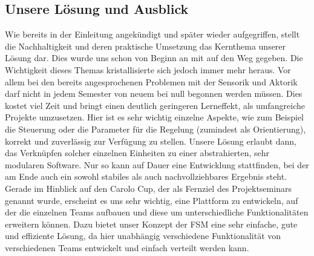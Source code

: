 \subsection{Unsere Lösung und Ausblick}
Wie bereits in der Einleitung angekündigt und später wieder aufgegriffen, stellt die Nachhaltigkeit und deren praktische Umsetzung das Kernthema unserer Lösung dar. Dies wurde uns schon von Beginn an mit auf den Weg gegeben. Die Wichtigkeit dieses Themas kristallisierte sich jedoch immer mehr heraus. Vor allem bei den bereits angesprochenen Problemen mit der Sensorik und Aktorik darf nicht in jedem Semester von neuem bei null begonnen werden müssen. Dies kostet viel Zeit und bringt einen deutlich geringeren Lerneffekt, als umfangreiche Projekte umzusetzen. Hier ist es sehr wichtig einzelne Aspekte, wie zum Beispiel die Steuerung oder die Parameter für die Regelung (zumindest als Orientierung), korrekt und zuverlässig zur Verfügung zu stellen. Unsere Lösung erlaubt dann, das Verknüpfen solcher einzelnen Einheiten zu einer abstrahierten, sehr modularen Software. Nur so kann auf Dauer eine Entwicklung stattfinden, bei der am Ende auch ein sowohl stabiles als auch nachvollziehbares Ergebnis steht.
\newline
\newline
Gerade im Hinblick auf den Carolo Cup, der als Fernziel des Projektseminars genannt wurde, erscheint es uns sehr wichtig, eine Plattform zu entwickeln, auf der die einzelnen Teams aufbauen  und diese um unterschiedliche Funktionalitäten erweitern können. Dazu bietet unser Konzept der FSM eine sehr einfache, gute und effiziente Lösung, da hier unabhängig verschiedene Funktionalität von verschiedenen Teams entwickelt und einfach verteilt werden kann.
